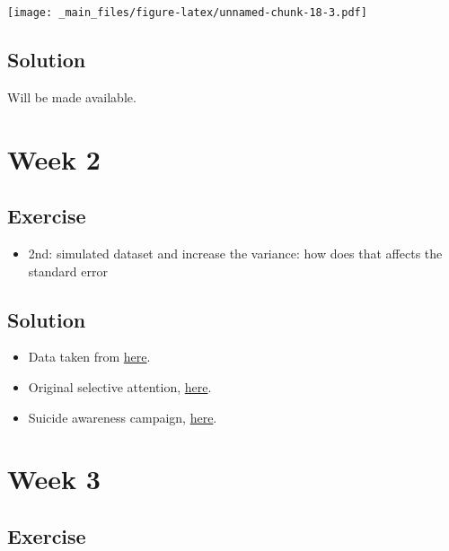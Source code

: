 \documentclass[
]{book}
\providecommand{\tightlist}{%
  \setlength{\itemsep}{0pt}\setlength{\parskip}{0pt}}
\begin{document}
\texttt{[image: \_main\_files/figure-latex/unnamed-chunk-18-3.pdf]}

\hypertarget{solution}{%
\section{Solution}\label{solution}}

Will be made available.

\hypertarget{week-2}{%
\chapter{Week 2}\label{week-2}}

\hypertarget{exercise}{%
\section{Exercise}\label{exercise}}

\begin{itemize}
\tightlist
\item
  2nd: simulated dataset and increase the variance: how does that affects the standard error
\end{itemize}

\hypertarget{solution-1}{%
\section{Solution}\label{solution-1}}

\begin{itemize}
\item
  Data taken from \href{https://communities.sas.com/t5/Graphics-Programming/Fun-With-SAS-ODS-Graphics-Don-t-Miss-the-Gorilla-in-the-Data/td-p/697286}{here}.
\item
  Original selective attention, \href{https://www.youtube.com/watch?v=vJG698U2Mvo}{here}.
\item
  Suicide awareness campaign, \href{https://www.youtube.com/watch?v=Lw-YPKR0grk}{here}.
\end{itemize}

\hypertarget{week-3}{%
\chapter{Week 3}\label{week-3}}

\hypertarget{exercise-1}{%
\section{Exercise}\label{exercise-1}}
\end{document}
